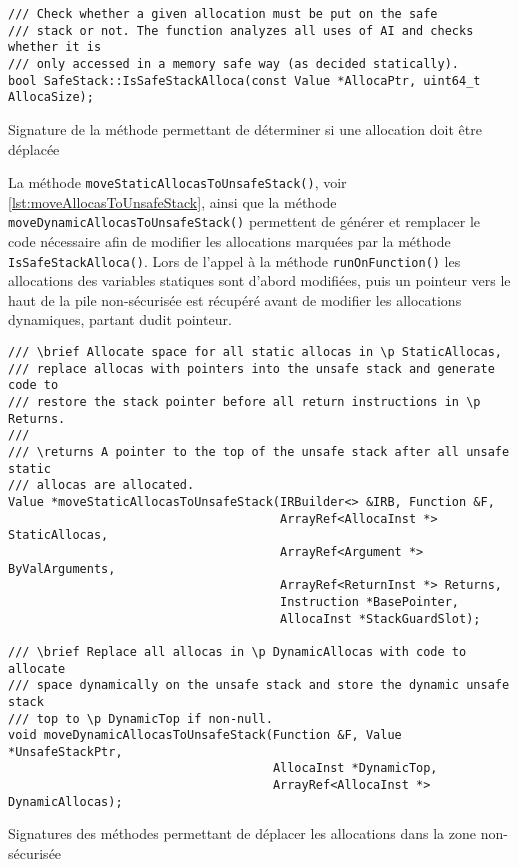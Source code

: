 \begin{listing}
	\begin{verbatim}
/// Check whether a given allocation must be put on the safe
/// stack or not. The function analyzes all uses of AI and checks whether it is
/// only accessed in a memory safe way (as decided statically).
bool SafeStack::IsSafeStackAlloca(const Value *AllocaPtr, uint64_t AllocaSize);
	\end{verbatim}
	\caption{Signature de la méthode permettant de déterminer si une allocation doit être déplacée}
	\label{lst:IsSafeStackAllocaHeader}
\end{listing}

La méthode \texttt{moveStaticAllocasToUnsafeStack()}, voir \autoref{lst:moveAllocasToUnsafeStack}, ainsi que la méthode  \texttt{moveDynamicAllocasToUnsafeStack()} permettent de générer et remplacer le code nécessaire afin de modifier les allocations marquées par la méthode \texttt{IsSafeStackAlloca()}. Lors de l'appel à la méthode \texttt{runOnFunction()} les allocations des variables statiques sont d'abord modifiées, puis un pointeur vers le haut de la pile non-sécurisée est récupéré avant de modifier les allocations dynamiques, partant dudit pointeur.

\begin{listing}
	\begin{verbatim}
/// \brief Allocate space for all static allocas in \p StaticAllocas,
/// replace allocas with pointers into the unsafe stack and generate code to
/// restore the stack pointer before all return instructions in \p Returns.
///
/// \returns A pointer to the top of the unsafe stack after all unsafe static
/// allocas are allocated.
Value *moveStaticAllocasToUnsafeStack(IRBuilder<> &IRB, Function &F,
                                      ArrayRef<AllocaInst *> StaticAllocas,
                                      ArrayRef<Argument *> ByValArguments,
                                      ArrayRef<ReturnInst *> Returns,
                                      Instruction *BasePointer,
                                      AllocaInst *StackGuardSlot);

/// \brief Replace all allocas in \p DynamicAllocas with code to allocate
/// space dynamically on the unsafe stack and store the dynamic unsafe stack
/// top to \p DynamicTop if non-null.
void moveDynamicAllocasToUnsafeStack(Function &F, Value *UnsafeStackPtr,
                                     AllocaInst *DynamicTop,
                                     ArrayRef<AllocaInst *> DynamicAllocas);
	\end{verbatim}
	\caption{Signatures des méthodes permettant de déplacer les allocations dans la zone non-sécurisée}
	\label{lst:moveAllocasToUnsafeStack}
\end{listing}

